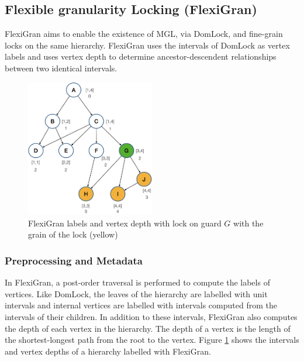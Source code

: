 \subsection{Flexible granularity Locking (FlexiGran)}

FlexiGran \cite{FlexiGran2024} aims to enable the existence of MGL, via DomLock, and fine-grain locks on the same hierarchy. 
FlexiGran uses the intervals of DomLock  as vertex labels and uses vertex depth to determine ancestor-descendent relationships between two identical intervals.

\begin{figure}
    \centering
    \captionsetup{justification=centering}
    \includegraphics[width=0.5\textwidth]{figures/flexigran_example_with_lock.png}
    \caption{FlexiGran labels and vertex depth with lock on guard $G$ with the grain of the lock (yellow)}
    \label{fig:flexigran_example_locked}
\end{figure}

\subsubsection{Preprocessing and Metadata}

In FlexiGran, a post-order traversal is performed to compute the labels of vertices. Like DomLock, the leaves of the hierarchy are labelled with unit intervals and internal vertices are labelled with intervals computed from the intervals of their children. In addition to these intervals, FlexiGran also computes the depth of each vertex in the hierarchy. The depth of a vertex is the length of the shortest-longest path from the root to the vertex. Figure \ref{fig:flexigran_example_locked} shows the intervals and vertex depths of a hierarchy labelled with FlexiGran.

